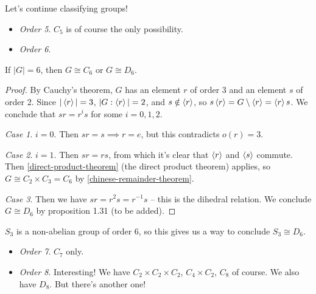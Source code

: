 \documentclass{../../template/note}
\begin{document}
    Let's continue classifying groups!

    \begin{itemize}
        \item \emph{Order 5}. \(C_5\) is of course the only possibility.
        \item \emph{Order 6}.
    \end{itemize}
    
    \begin{lemma}
        If \(|G| = 6\), then \(G \cong C_6\) or \(G \cong D_6\).
    \end{lemma}
    
    \begin{proof}
        By Cauchy's theorem, \(G\) has an element \(r\) of order 3 and an element \(s\) of order 2. Since \(|\left \langle r \right \rangle| = 3\), \(|G:\left \langle r \right \rangle| = 2\), and \(s \notin \left \langle r \right \rangle\), so \(s \left \langle r \right \rangle = G \setminus \left \langle r \right \rangle = \left \langle r \right \rangle s\). We conclude that \(sr = r^is\) for some \(i = 0, 1, 2\).

        \emph{Case 1}. \(i = 0\). Then \(sr = s \implies r = e\), but this contradicts \(o(r) = 3\).

        \emph{Case 2}. \(i = 1\). Then \(sr = rs\), from which it's clear that \(\left \langle r \right \rangle\) and \(\left \langle s \right \rangle\) commute. Then \cref{direct-product-theorem} (the direct product theorem) applies, so \(G \cong C_2 \times C_3 = C_6\) by \cref{chinese-remainder-theorem}.

        \emph{Case 3}. Then we have \(sr = r^2s = r^{-1}s\) -- this is the dihedral relation. We conclude \(G \cong D_6\) by proposition 1.31 (to be added).
    \end{proof}
    
    \begin{remark*}
        \(S_3\) is a non-abelian group of order 6, so this gives us a way to conclude \(S_3 \cong D_6\).
    \end{remark*}

    
    \begin{itemize}
        \item \emph{Order 7}. \(C_7\) only.
        \item \emph{Order 8}. Interesting! We have \(C_2 \times C_2 \times C_2\), \(C_4 \times C_2\), \(C_8\) of course. We also have \(D_8\). But there's another one!
    \end{itemize}
    
\end{document}
